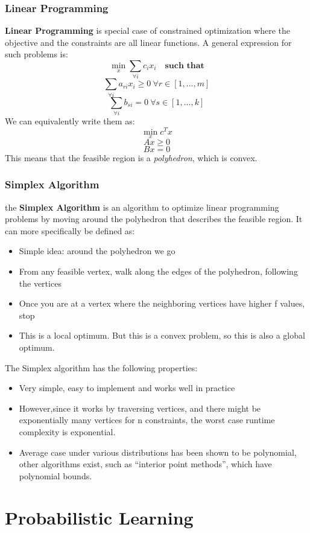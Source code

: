\documentclass[12pt, a4paper]{book}
\begin{document}
\subsection{Linear Programming}
\textbf{Linear Programming} is special case of constrained optimization where the objective and the constraints are all linear functions. A general expression for such problems is:
$$\min_x \sum_{\forall i}c_ix_i \quad \textbf{such that}$$
$$\sum_{\forall i}a_{ri}x_i \geq 0 \ \forall r \in [1,...,m]$$
$$\sum_{\forall i}b_{si} = 0 \ \forall s \in [1,...,k]$$
We can equivalently write them as:
$$\min_x c^Tx$$
$$Ax \geq 0$$
$$Bx = 0$$
This means that the feasible region is a \textit{polyhedron}, which is convex.

\subsection{Simplex Algorithm}
the \textbf{Simplex Algorithm} is an algorithm to optimize linear programming problems by moving around the polyhedron that describes the feasible region. It can more specifically be defined as:
\begin{itemize}
    \item Simple idea: around the polyhedron we go
    \item From any feasible vertex, walk along the edges of the polyhedron, following the vertices
    \item Once you are at a vertex where the neighboring vertices have higher f values, stop
    \item This is a local optimum. But this is a convex problem, so this is also a global optimum.\\
\end{itemize}
The Simplex algorithm has the following properties:
\begin{itemize}
    \item Very simple, easy to implement and works well in practice
    \item However,since it works by traversing vertices, and there might be exponentially many vertices for n constraints, the worst case runtime complexity is exponential.
    \item Average case under various distributions has been shown to be polynomial, other algorithms exist, such as “interior point methods”, which have polynomial bounds.
\end{itemize}


\newpage

\chapter{Probabilistic Learning}
\end{document}
